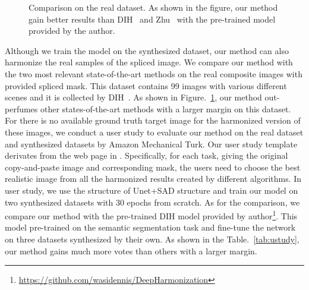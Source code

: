 \begin{figure}[t!]
\addtocounter{subfigure}{-9}
\caption{Comparison on the real dataset. As shown in the figure, our method gain better results than DIH~\cite{Tsai:2017kv} and Zhu~\cite{Zhu:2015tl} with the pre-trained model provided by the author.}
\label{fig:real}
\end{figure} Although we train the model on the synthesized dataset, our method can also harmonize the real samples of the spliced image. We compare our method with the two most relevant state-of-the-art methods on the real composite images with provided spliced mask. This dataset contains 99 images with various different scenes and it is collected by DIH~\cite{Tsai:2017kv}. As shown in Figure.~\ref{fig:real}, our method out-perfumes other states-of-the-art methods with a larger margin on this dataset. For there is no available ground truth target image for the harmonized version of these images, we conduct a user study to evaluate our method on the real dataset and synthesized datasets by Amazon Mechanical Turk. Our user study template derivates from the web page in \cite{Wu:2017wq}. Specifically, for each task, giving the original copy-and-paste image and corresponding mask, the users need to choose the best realistic image from all the harmonized results created by different algorithms. In user study, we use the structure of Unet+SAD structure and train our model on two synthesized datasets with 30 epochs from scratch. As for the comparison, we compare our method with the pre-trained DIH model provided by author\footnote{\hyperlink{https://github.com/wasidennis/DeepHarmonization}{https://github.com/wasidennis/DeepHarmonization}}. This model pre-trained on the semantic segmentation task and fine-tune the network on three datasets synthesized by their own. As shown in the Table.~\ref{tab:ustudy}, our method gains much more votes than others with a larger margin.

